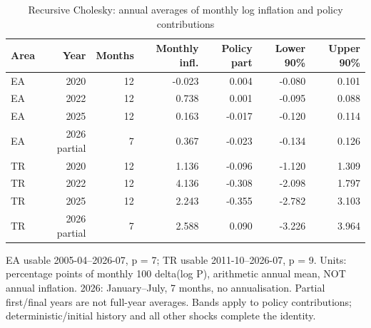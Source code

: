 \begin{table}[htbp]
\centering
\footnotesize
\caption{Recursive Cholesky: annual averages of monthly log inflation and policy contributions}
\begin{tabularx}{\linewidth}{Xrrrrrr}
\toprule
Area & Year & Months & Monthly infl. & Policy part & Lower 90\% & Upper 90\% \\
\midrule
EA & 2020 & 12 & -0.023 & 0.004 & -0.080 & 0.101 \\
EA & 2022 & 12 & 0.738 & 0.001 & -0.095 & 0.088 \\
EA & 2025 & 12 & 0.163 & -0.017 & -0.120 & 0.114 \\
EA & 2026 partial & 7 & 0.367 & -0.023 & -0.134 & 0.126 \\
TR & 2020 & 12 & 1.136 & -0.096 & -1.120 & 1.309 \\
TR & 2022 & 12 & 4.136 & -0.308 & -2.098 & 1.797 \\
TR & 2025 & 12 & 2.243 & -0.355 & -2.782 & 3.103 \\
TR & 2026 partial & 7 & 2.588 & 0.090 & -3.226 & 3.964 \\
\bottomrule
\end{tabularx}
\par\vspace{3pt}\begin{minipage}{\linewidth}\footnotesize EA usable 2005-04–2026-07, p = 7; TR usable 2011-10–2026-07, p = 9.\allowbreak{} Units: percentage points of monthly 100 delta(log P), arithmetic annual mean, NOT annual inflation.\allowbreak{} 2026: January–July, 7 months, no annualisation.\allowbreak{} Partial first/final years are not full-year averages.\allowbreak{} Bands apply to policy contributions; deterministic/initial history and all other shocks complete the identity.\allowbreak{}\end{minipage}
\end{table}

